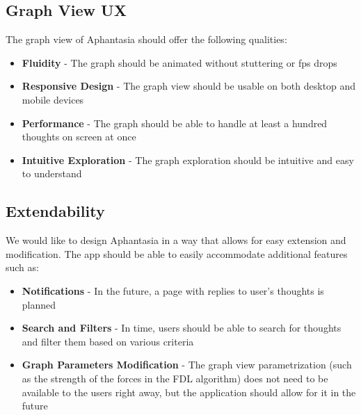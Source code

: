 \subsection{Graph View UX}
The graph view of Aphantasia should offer the following qualities:
\begin{itemize}
  \item \textbf{Fluidity} - The graph should be animated without stuttering or \gls{fps} drops
  \item \textbf{Responsive Design} - The graph view should be usable on both desktop and mobile devices
  \item \textbf{Performance} - The graph should be able to handle at least a hundred thoughts on screen at once
  \item \textbf{Intuitive Exploration} - The graph exploration should be intuitive and easy to understand
\end{itemize}

\subsection{Extendability}
We would like to design Aphantasia in a way that allows for easy extension and modification.
The app should be able to easily accommodate additional features such as:
\begin{itemize}
  \item \textbf{Notifications} - In the future, a page with replies to user's thoughts is planned
  \item \textbf{Search and Filters} - In time, users should be able to search for thoughts and filter them based on various criteria
  \item \textbf{Graph Parameters Modification} - The graph view parametrization (such as the strength of the forces in the FDL algorithm)
 does not need to be available to the users right away, but the application should allow for it in the future
\end{itemize}